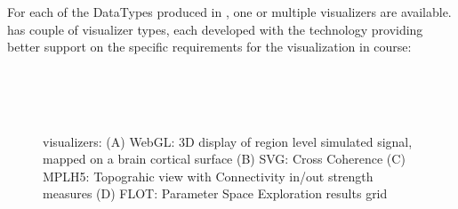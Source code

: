 For each of the DataTypes produced in \TVB, one or multiple visualizers are available.	
\TVB has couple of  visualizer types, each developed with the technology providing better support on the specific requirements for the visualization in course:

 \begin{figure}[!htbp]
	\\
	\\
	\\
	\caption{\TVB visualizers: 
	(A) WebGL: 3D display of region level simulated signal, mapped on a brain cortical surface
	(B) SVG: Cross Coherence
	(C) MPLH5:  Topograhic view with Connectivity in/out strength measures
	(D) FLOT: Parameter Space Exploration results grid}
        \label{fig:viewers}
\end{figure}

